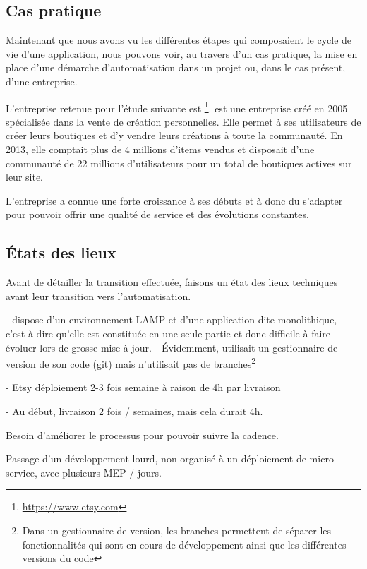 \subsection{Cas pratique}

Maintenant que nous avons vu les différentes étapes qui composaient le cycle de vie d'une application, nous pouvons voir, au travers d'un cas pratique, la mise en place d'une démarche d'automatisation dans un projet ou, dans le cas présent, d'une entreprise.

L'entreprise retenue pour l'étude suivante est \etsy\footnote{\url{https://www.etsy.com}}. \etsy{} est une entreprise créé en 2005 spécialisée dans la vente de création personnelles. Elle permet à ses utilisateurs de créer leurs boutiques et d'y vendre leurs créations à toute la communauté. En 2013, elle comptait plus de 4 millions d'items vendus et disposait d'une communauté de 22 millions d'utilisateurs pour un total de  boutiques actives sur leur site.

L'entreprise a connue une forte croissance à ses débuts et à donc du s'adapter pour pouvoir offrir une qualité de service et des évolutions constantes.

\subsection{États des lieux}

Avant de détailler la transition effectuée, faisons un état des lieux techniques avant leur transition vers l'automatisation.

- \etsy{} dispose d'un environnement \gls{LAMP} et d'une application dite monolithique, c'est-à-dire qu'elle est constituée en une seule partie et donc difficile à faire évoluer lors de grosse mise à jour.
- Évidemment, \etsy{} utilisait un gestionnaire de version de son code (\gls{git}) mais n'utilisait pas de branches\footnote{Dans un gestionnaire de version, les branches permettent de séparer les fonctionnalités qui sont en cours de développement ainsi que les différentes versions du code}

- Etsy déploiement 2-3 fois semaine à raison de 4h par livraison


- Au début, livraison 2 fois / semaines, mais cela durait 4h.

Besoin d'améliorer le processus pour pouvoir suivre la cadence.

Passage d'un développement lourd, non organisé à un déploiement de micro service, avec plusieurs MEP / jours.


